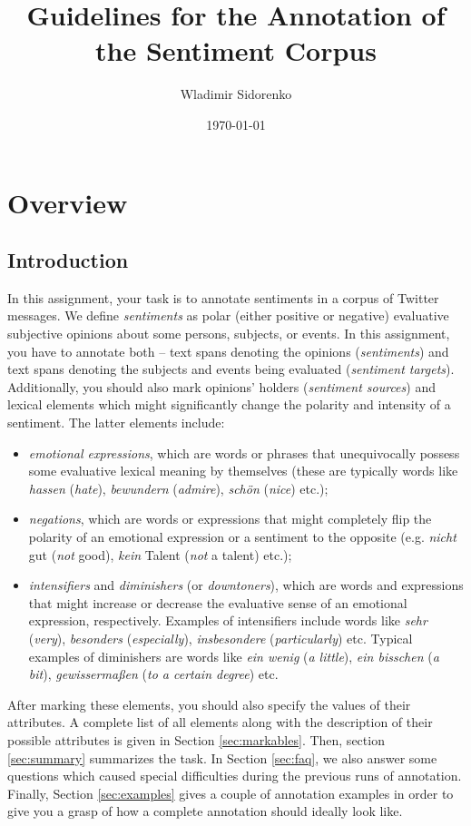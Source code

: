 \documentclass[11pt,a4paper]{article}
\author{Wladimir Sidorenko}
\date{\today}
\title{Guidelines for the Annotation of the Sentiment Corpus}
\theoremstyle{mytheoremstyle}
\begin{document}
\maketitle{}
\section{Overview}
\subsection{Introduction}

In this assignment, your task is to annotate sentiments in a corpus of
Twitter messages.  We define \emph{sentiments} as polar (either
positive or negative) evaluative subjective opinions about some
persons, subjects, or events.  In this assignment, you have to
annotate both -- text spans denoting the opinions (\emph{sentiments})
and text spans denoting the subjects and events being evaluated
(\emph{sentiment targets}).  Additionally, you should also mark
opinions' holders (\emph{sentiment sources}) and lexical elements
which might significantly change the polarity and intensity of a
sentiment.  The latter elements include:
\begin{itemize}
  \item \emph{emotional expressions}, which are words or phrases that
    unequivocally possess some evaluative lexical meaning by
    themselves (these are typically words like \emph{hassen}
    (\emph{hate}), \emph{bewundern} (\emph{admire}), \emph{sch\"on}
    (\emph{nice}) etc.);
  \item \emph{negations}, which are words or expressions that might
    completely flip the polarity of an emotional expression or a
    sentiment to the opposite (e.g. \emph{nicht} gut (\emph{not}
    good), \emph{kein} Talent (\emph{not} a talent) etc.);
  \item \emph{intensifiers} and \emph{diminishers} (or
    \emph{downtoners}), which are words and expressions that might
    increase or decrease the evaluative sense of an emotional
    expression, respectively.  Examples of intensifiers include words
    like \emph{sehr} (\emph{very}), \emph{besonders}
    (\emph{especially}), \emph{insbesondere} (\emph{particularly})
    etc.  Typical examples of diminishers are words like \emph{ein
      wenig} (\emph{a little}), \emph{ein bisschen} (\emph{a bit}),
    \emph{gewisserma\ss{}en} (\emph{to a certain degree}) etc.
\end{itemize}

After marking these elements, you should also specify the values of their
attributes.  A complete list of all elements along with the description of
their possible attributes is given in Section \ref{sec:markables}.  Then,
section \ref{sec:summary} summarizes the task.  In Section \ref{sec:faq}, we
also answer some questions which caused special difficulties during the
previous runs of annotation.  Finally, Section \ref{sec:examples} gives a
couple of annotation examples in order to give you a grasp of how a complete
annotation should ideally look like.
\end{document}
